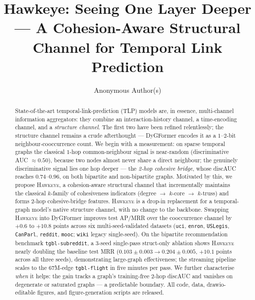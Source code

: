 \documentclass[sigconf,nonacm,review]{acmart}
\newcommand{\method}{\textsc{Hawkeye}\xspace}
\begin{document}
\title{Hawkeye: Seeing One Layer Deeper --- A Cohesion-Aware Structural Channel
for Temporal Link Prediction}

\author{Anonymous Author(s)}

\renewcommand{\shortauthors}{Anonymous}

\begin{abstract}
State-of-the-art temporal-link-prediction (TLP) models are, in essence,
multi-channel information aggregators: they combine an interaction-history
channel, a time-encoding channel, and a \emph{structure channel}. The first two
have been refined relentlessly; the structure channel remains a crude
afterthought --- DyGFormer encodes it as a $1$--$2$-bit neighbour-cooccurrence
count. We begin with a measurement: on sparse temporal graphs the classical
$1$-hop common-neighbour signal is near-random (discriminative AUC
$\approx 0.50$), because two nodes almost never share a direct neighbour; the
genuinely discriminative signal lies one hop deeper --- the \emph{2-hop cohesive
bridge}, whose discAUC reaches $0.74$--$0.96$, on both bipartite and
non-bipartite graphs. Motivated by this, we propose \method, a cohesion-aware
structural channel that incrementally maintains the classical $k$-family of
cohesiveness indicators (degree $\to$ $k$-core $\to$ $k$-truss) and forms
2-hop cohesive-bridge features. \method is a drop-in replacement for a
temporal-graph model's native structure channel, with no change to the
backbone. Swapping \method into DyGFormer improves test AP/MRR over the
cooccurrence channel by $+0.6$ to $+10.8$ points across six
multi-seed-validated datasets (\texttt{uci}, \texttt{enron},
\texttt{USLegis}, \texttt{CanParl}, \texttt{reddit}, \texttt{mooc};
\texttt{wiki} legacy single-seed). On the bipartite recommendation
benchmark \texttt{tgbl-subreddit}, a 3-seed single-pass struct-only
ablation shows \method nearly doubling the baseline test MRR
($0.103\!\pm\!0.003 \to 0.204\!\pm\!0.005$, $+10.1$ points across all
three seeds), demonstrating large-graph effectiveness; the streaming pipeline scales to the 67M-edge
\texttt{tgbl-flight} in five minutes per pass. We further
characterise \emph{when} it helps: the gain tracks a graph's
training-free 2-hop discAUC and vanishes on degenerate or saturated
graphs --- a predictable boundary. All code, data, drawio-editable
figures, and figure-generation scripts are released.
\end{abstract}
\end{document}
